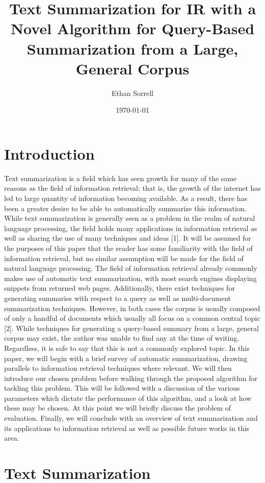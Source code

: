 \documentclass[11pt]{article}
\author{Ethan Sorrell}
\date{\today}
\title{Text Summarization for IR with a Novel Algorithm for Query-Based Summarization from a Large, General Corpus}
\begin{document}
\maketitle
\tableofcontents

\section{Introduction}
\label{sec:org127e3b2}
Text summarization is a field which has seen growth for many of the same reasons as the field of information retrieval: that is, the growth of the internet has led to large quantity of information becoming available. As a result, there has been a greater desire to be able to automatically summarize this information. While text summarization is generally seen as a problem in the realm of natural language processing, the field holds many applications in information retrieval as well as sharing the use of many techniques and ideas [1]. It will be assumed for the purposes of this paper that the reader has some familiarity with the field of information retrieval, but no similar assumption will be made for the field of natural language processing. The field of information retrieval already commonly makes use of automatic text summarization, with most search engines displaying snippets from returned web pages. Additionally, there exist techniques for generating summaries with respect to a query as well as multi-document summarization techniques. However, in both cases the corpus is usually composed of only a handful of documents which usually all focus on a common central topic [2]. While techniques for generating a query-based summary from a large, general corpus may exist, the author was unable to find any at the time of writing. Regardless, it is safe to say that this is not a commonly explored topic.
In this paper, we will begin with a brief survey of automatic summarization, drawing parallels to information retrieval techniques where relevant. We will then introduce our chosen problem before walking through the proposed algorithm for tackling this problem. This will be followed with a discussion of the various parameters which dictate the performance of this algorithm, and a look at how these may be chosen. At this point we will briefly discuss the problem of evaluation. Finally, we will conclude with an overview of text summarization and its applications to information retrieval as well as possible future works in this area.
\section{Text Summarization}
\label{sec:org3a8b596}
\end{document}
